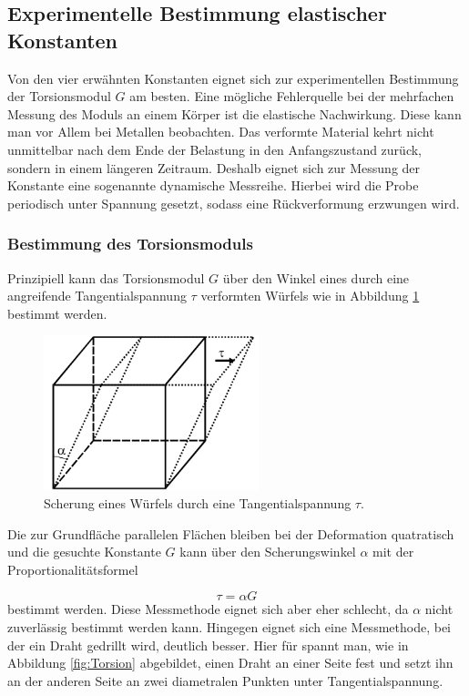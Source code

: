 \subsection{Experimentelle Bestimmung elastischer Konstanten}

Von den vier erwähnten Konstanten eignet sich zur experimentellen Bestimmung
der Torsionsmodul $G$ am besten.
Eine mögliche Fehlerquelle bei der mehrfachen Messung des Moduls an einem
Körper ist die elastische Nachwirkung. Diese kann man vor Allem bei Metallen
beobachten. Das verformte Material kehrt nicht unmittelbar nach dem Ende der
Belastung in den Anfangszustand zurück, sondern in einem längeren Zeitraum.
Deshalb eignet sich zur Messung der Konstante eine sogenannte dynamische
Messreihe. Hierbei wird die Probe periodisch unter Spannung gesetzt, sodass
eine Rückverformung erzwungen wird.


\subsubsection{Bestimmung des Torsionsmoduls}

Prinzipiell kann das Torsionsmodul $G$ über den Winkel eines
durch eine angreifende Tangentialspannung $\tau$ verformten Würfels
wie in Abbildung \ref{fig:WurfelScher} bestimmt werden.

\newpage

\begin{figure}[h]
  \centering
  \includegraphics[height=4.5cm]{ScherungWuerfel.png}
  \caption{Scherung eines Würfels durch eine Tangentialspannung $\tau$.
  \cite{anleitung}}
  \label{fig:WurfelScher}
\end{figure}

Die zur Grundfläche parallelen Flächen bleiben bei der Deformation quatratisch
und die gesuchte Konstante $G$ kann über den Scherungswinkel $\alpha$ mit der
Proportionalitätsformel

\begin{equation}
  \tau = \alpha G
  \label{eqn:Scherung}
\end{equation}
bestimmt werden.
Diese Messmethode eignet sich aber eher schlecht, da $\alpha$ nicht zuverlässig
bestimmt werden kann.
Hingegen eignet sich eine Messmethode, bei der ein Draht gedrillt
wird, deutlich besser. Hier für spannt man, wie in Abbildung \ref{fig:Torsion}
abgebildet, einen Draht an einer Seite fest und setzt ihn an der anderen Seite
an zwei diametralen Punkten unter Tangentialspannung.

